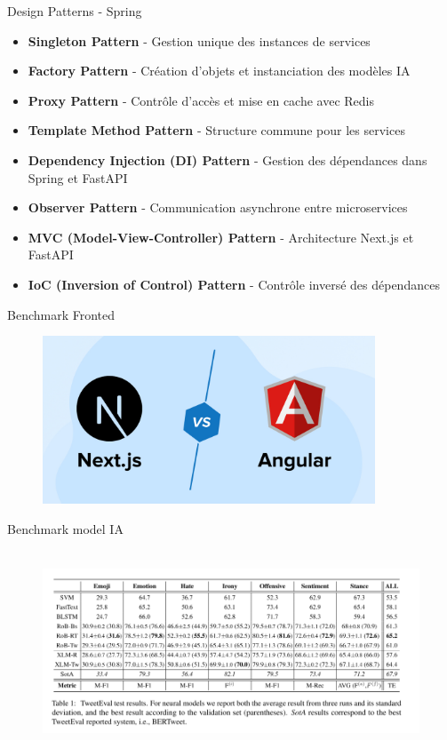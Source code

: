 \begin{frame}{Design Patterns - Spring}
    \begin{itemize}
        \item \textbf{Singleton Pattern} - Gestion unique des instances de services
        \item \textbf{Factory Pattern} - Création d'objets et instanciation des modèles IA
        \item \textbf{Proxy Pattern} - Contrôle d'accès et mise en cache avec Redis
        \item \textbf{Template Method Pattern} - Structure commune pour les services
        \item \textbf{Dependency Injection (DI) Pattern} - Gestion des dépendances dans Spring et FastAPI
        \item \textbf{Observer Pattern} - Communication asynchrone entre microservices
        \item \textbf{MVC (Model-View-Controller) Pattern} - Architecture Next.js et FastAPI
        \item \textbf{IoC (Inversion of Control) Pattern} - Contrôle inversé des dépendances
    \end{itemize}
\end{frame}
\begin{frame}{Benchmark Fronted}
    \begin{figure}[H]
        \centering
        \includegraphics[height=5cm]{assets/images/bench-next.jpg}
    \end{figure}
\end{frame}

\begin{frame}{Benchmark model IA}
    \begin{figure}[H]
        \centering
        \includegraphics[height=6cm]{assets/images/ai-acc-dataset.png}
    \end{figure}
\end{frame}

